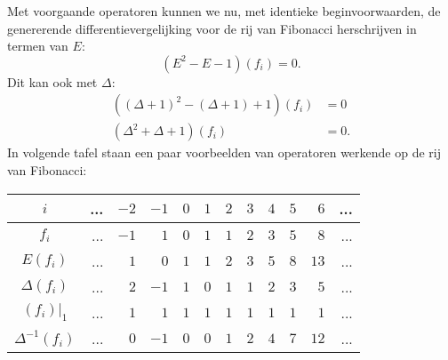 \documentclass[a4paper,12pt]{article}
\begin{document}


\begin{example}
    Met voorgaande operatoren kunnen we nu, met identieke beginvoorwaarden, de genererende differentievergelijking voor de rij van Fibonacci herschrijven in termen van $E$:
    $$
        (E^2 -E -1)(f_i) =0.
    $$
    Dit kan ook met $\Delta$:
    \begin{align*}
        ((\Delta +1)^2 - (\Delta +1) +1)(f_i) & =0  \\
        (\Delta^2 + \Delta + 1)(f_i)          & =0.
    \end{align*}
    In volgende tafel staan een paar voorbeelden van operatoren werkende op de rij van Fibonacci:

    \begin{table}[ht]
        \centering
        \begin{tabular}{|c||r|r|r|r|r|r|r|r|r|r|r|} \hline
            $i$                & ... & $-2$ & $-1$ & $0$ & $1$ & $2$ & $3$ & $4$ & $5$ & $6$  & ... \\ \hline \hline
            $f_i$              & ... & $-1$ & $1$  & $0$ & $1$ & $1$ & $2$ & $3$ & $5$ & $8$  & ... \\ \hline
            $E(f_i)$           & ... & $1$  & $0$  & $1$ & $1$ & $2$ & $3$ & $5$ & $8$ & $13$ & ... \\ \hline
            $\Delta(f_i)$      & ... & $2$  & $-1$ & $1$ & $0$ & $1$ & $1$ & $2$ & $3$ & $5$  & ... \\ \hline
            $(f_i)|_1$         & ... & $1$  & $1$  & $1$ & $1$ & $1$ & $1$ & $1$ & $1$ & $1$  & ... \\ \hline
            $\Delta^{-1}(f_i)$ & ... & $0$  & $-1$ & $0$ & $0$ & $1$ & $2$ & $4$ & $7$ & $12$ & ... \\ \hline
        \end{tabular}
    \end{table}
\end{example}
\end{document}
